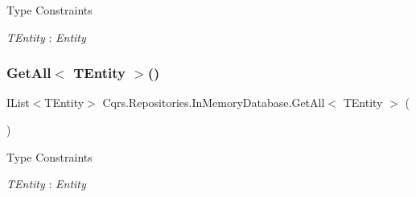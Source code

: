\begin{Desc}
\item[Type Constraints]\begin{description}
\item[{\em T\+Entity} : {\em Entity}]\end{description}
\end{Desc}
\mbox{\label{classCqrs_1_1Repositories_1_1InMemoryDatabase_a83104b325c203f6768bb8ffd2c9c3381}} 
\subsubsection{\texorpdfstring{Get\+All$<$ T\+Entity $>$()}{GetAll< TEntity >()}}
{\footnotesize\ttfamily I\+List$<$T\+Entity$>$ Cqrs.\+Repositories.\+In\+Memory\+Database.\+Get\+All$<$ T\+Entity $>$ (\begin{DoxyParamCaption}{ }\end{DoxyParamCaption})}

\begin{Desc}
\item[Type Constraints]\begin{description}
\item[{\em T\+Entity} : {\em Entity}]\end{description}
\end{Desc}
